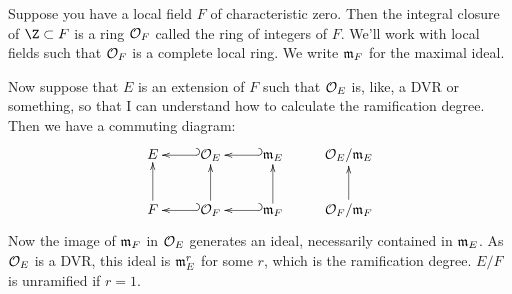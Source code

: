 \documentclass[11pt]{article}
\begin{document}
Suppose you have a local field $F$ of characteristic zero. Then the integral
closure of $\Z\subset F$ is a ring $\mathcal{O}_F$ called the ring of integers of $F$.
We'll work with local fields such that $\mathcal{O}_F$ is a complete local ring.
We write $\mathfrak{m}_F$ for the maximal ideal.

Now suppose that $E$ is an extension of $F$ such that $\mathcal{O}_E$ is, like, a DVR
or something, so that I can understand how to calculate the ramification degree.
Then we have a commuting diagram:
\[\xymatrix{
E&\calO_E\ar@{_{(}->}[l]&\frakm_E\ar@{_{(}->}[l]&\calO_E/\frakm_E\\
F\ar[u]&\calO_F\ar@{_{(}->}[l]\ar[u]&\frakm_F\ar@{_{(}->}
[l]\ar[u]&\calO_F/\frakm_F\ar[u]
}\]
Now the image of $\mathfrak{m}_F$ in $\mathcal{O}_E$ generates an ideal, necessarily
contained in $\mathfrak{m}_E$. As $\mathcal{O}_E$ is a DVR, this ideal is $\mathfrak{m}_E^r$ for
some $r$, which is the ramification degree. $E/F$ is unramified if $r=1$.
\end{document}
